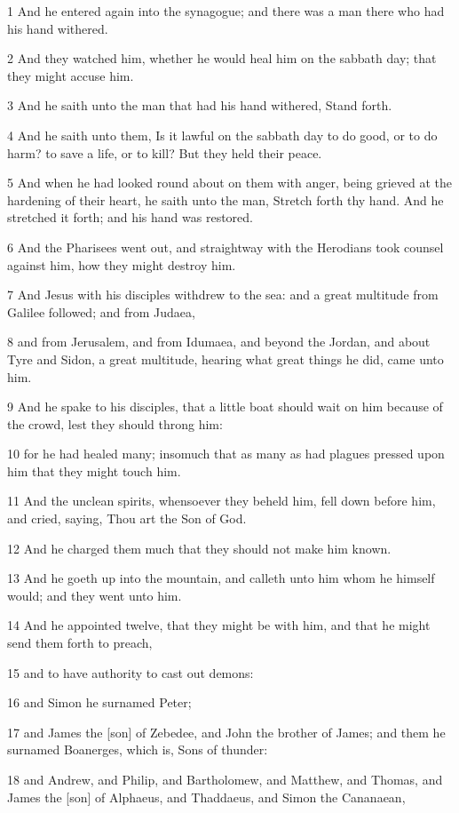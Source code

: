 \par 1 And he entered again into the synagogue; and there was a man there who had his hand withered.
\par 2 And they watched him, whether he would heal him on the sabbath day; that they might accuse him.
\par 3 And he saith unto the man that had his hand withered, Stand forth.
\par 4 And he saith unto them, Is it lawful on the sabbath day to do good, or to do harm? to save a life, or to kill? But they held their peace.
\par 5 And when he had looked round about on them with anger, being grieved at the hardening of their heart, he saith unto the man, Stretch forth thy hand. And he stretched it forth; and his hand was restored.
\par 6 And the Pharisees went out, and straightway with the Herodians took counsel against him, how they might destroy him.
\par 7 And Jesus with his disciples withdrew to the sea: and a great multitude from Galilee followed; and from Judaea,
\par 8 and from Jerusalem, and from Idumaea, and beyond the Jordan, and about Tyre and Sidon, a great multitude, hearing what great things he did, came unto him.
\par 9 And he spake to his disciples, that a little boat should wait on him because of the crowd, lest they should throng him:
\par 10 for he had healed many; insomuch that as many as had plagues pressed upon him that they might touch him.
\par 11 And the unclean spirits, whensoever they beheld him, fell down before him, and cried, saying, Thou art the Son of God.
\par 12 And he charged them much that they should not make him known.
\par 13 And he goeth up into the mountain, and calleth unto him whom he himself would; and they went unto him.
\par 14 And he appointed twelve, that they might be with him, and that he might send them forth to preach,
\par 15 and to have authority to cast out demons:
\par 16 and Simon he surnamed Peter;
\par 17 and James the [son] of Zebedee, and John the brother of James; and them he surnamed Boanerges, which is, Sons of thunder:
\par 18 and Andrew, and Philip, and Bartholomew, and Matthew, and Thomas, and James the [son] of Alphaeus, and Thaddaeus, and Simon the Cananaean,
